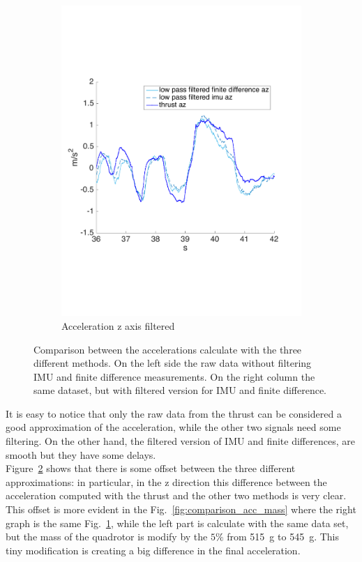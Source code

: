 \begin{figure}[!htbp]
\begin{subfigure}[b]{0.45\textwidth}
     \includegraphics[width=\textwidth]{img/acceleration_mass_changed_filtered_z.pdf}
        \caption{Acceleration z axis filtered}
        \label{fig:comparison_accz_fil}
   \end{subfigure}
    \caption{Comparison between the accelerations calculate with the three different methods. On the left side the raw data without filtering IMU and finite difference measurements. On the right column the same dataset, but with filtered version for IMU and finite difference.}
    \label{fig:comparison_acc}
\end{figure}

It is easy to notice that only the raw data from the thrust can be considered a good approximation of the acceleration, while the other two signals need some filtering. On the other hand, the filtered version of IMU and finite differences, are smooth but they have some delays.\\

Figure~\ref{fig:comparison_acc} shows that there is some offset between the three different approximations: in particular, in the z direction this difference between the acceleration computed with the thrust and the other two methods is very clear.\\
This offset is more evident in the Fig.~\ref{fig:comparison_acc_mass} where the right graph is the same Fig.~\ref{fig:comparison_accz_fil}, while the left part is calculate with the same data set, but the mass of the quadrotor is modify by the $5\%$ from \SI{515}{\gram} to \SI{545}{\gram}. This tiny modification is creating a big difference in the final acceleration.

